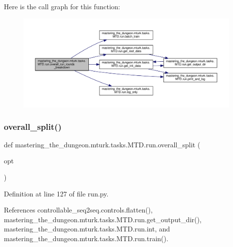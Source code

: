 Here is the call graph for this function\+:
\nopagebreak
\begin{figure}[H]
\begin{center}
\leavevmode
\includegraphics[width=350pt]{namespacemastering__the__dungeon_1_1mturk_1_1tasks_1_1MTD_1_1run_a95ef9b461e307b0b7f6bcedec8e24b9f_cgraph}
\end{center}
\end{figure}
\mbox{\label{namespacemastering__the__dungeon_1_1mturk_1_1tasks_1_1MTD_1_1run_aa7818a9d2c6c401d2c6aeb75dec54397}} 
\subsubsection{\texorpdfstring{overall\+\_\+split()}{overall\_split()}}
{\footnotesize\ttfamily def mastering\+\_\+the\+\_\+dungeon.\+mturk.\+tasks.\+M\+T\+D.\+run.\+overall\+\_\+split (\begin{DoxyParamCaption}\item[{}]{opt }\end{DoxyParamCaption})}



Definition at line 127 of file run.\+py.



References controllable\+\_\+seq2seq.\+controls.\+flatten(), mastering\+\_\+the\+\_\+dungeon.\+mturk.\+tasks.\+M\+T\+D.\+run.\+get\+\_\+output\+\_\+dir(), mastering\+\_\+the\+\_\+dungeon.\+mturk.\+tasks.\+M\+T\+D.\+run.\+int, and mastering\+\_\+the\+\_\+dungeon.\+mturk.\+tasks.\+M\+T\+D.\+run.\+train().

